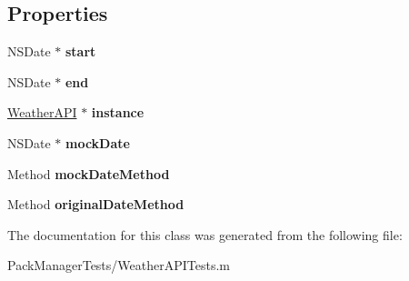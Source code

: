 \subsection*{Properties}
\begin{DoxyCompactItemize}
\item 
\hypertarget{interface_weather_a_p_i_tests_a16ec8899bbd147f51528e0d2551cf9ad}{N\-S\-Date $\ast$ {\bfseries start}}\label{interface_weather_a_p_i_tests_a16ec8899bbd147f51528e0d2551cf9ad}

\item 
\hypertarget{interface_weather_a_p_i_tests_a31ba507f95638c19c024543a21821e04}{N\-S\-Date $\ast$ {\bfseries end}}\label{interface_weather_a_p_i_tests_a31ba507f95638c19c024543a21821e04}

\item 
\hypertarget{interface_weather_a_p_i_tests_a4a55760201efe2ddb01c7e55093998c0}{\hyperlink{interface_weather_a_p_i}{Weather\-A\-P\-I} $\ast$ {\bfseries instance}}\label{interface_weather_a_p_i_tests_a4a55760201efe2ddb01c7e55093998c0}

\item 
\hypertarget{interface_weather_a_p_i_tests_a2cd7ccb4bfebbc9cfc1123ef075703b2}{N\-S\-Date $\ast$ {\bfseries mock\-Date}}\label{interface_weather_a_p_i_tests_a2cd7ccb4bfebbc9cfc1123ef075703b2}

\item 
\hypertarget{interface_weather_a_p_i_tests_ae40fb0fdc78a7ce5f4d8de71a5f5b9fb}{Method {\bfseries mock\-Date\-Method}}\label{interface_weather_a_p_i_tests_ae40fb0fdc78a7ce5f4d8de71a5f5b9fb}

\item 
\hypertarget{interface_weather_a_p_i_tests_a816acef9dfa75cff7b8d17da37f42683}{Method {\bfseries original\-Date\-Method}}\label{interface_weather_a_p_i_tests_a816acef9dfa75cff7b8d17da37f42683}

\end{DoxyCompactItemize}


The documentation for this class was generated from the following file\-:\begin{DoxyCompactItemize}
\item 
Pack\-Manager\-Tests/Weather\-A\-P\-I\-Tests.\-m\end{DoxyCompactItemize}
